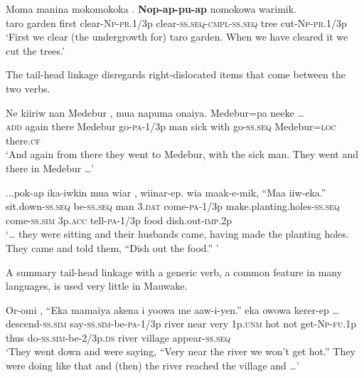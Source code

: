 \ea%
\label{ex:8:x1517}
\gll Moma  manina  mokomokoka  \textstyleEmphasizedVernacularWords{-}\textstyleEmphasizedVernacularWords{-}. \textbf{Nop}\textbf{-}\textbf{ap-pu}\textbf{-}\textbf{ap}  nomokowa  warimik. \\
taro  garden  first  clear-\textsc{Np}-\textsc{pr}.1/3p clear-\textsc{ss}.\textsc{seq}-\textsc{cmpl}-\textsc{ss}.\textsc{seq} tree cut-\textsc{Np}-\textsc{pr}.1/3p     \\
\glt`First we clear (the undergrowth for) taro garden. When we have cleared it we cut the trees.'
\z
{}


The tail-head linkage disregards right-dislocated items that come between the two verbs. 

\ea%
\label{ex:8:x1518}
\gll Ne  kiiriw  nan  Medebur  ,  mua  napuma  onaiya.   Medebur=pa  neeke  {\dots}\\
\textsc{add} again  there  Medebur go-\textsc{pa}-1/3p  man  sick  with go-\textsc{ss}.\textsc{seq} Medebur=\textsc{loc} there.\textsc{cf}\\
\glt`And again from there they went to Medebur, with the sick man. They went and there in Medebur {\dots}'
\z


\ea%
\label{ex:8:x1519}
\gll ...pok-ap  ika-iwkin  mua  wiar  , wiinar-ep.    wia  maak-e-mik, ``Maa  iiw-eka.'' \\
sit.down-\textsc{ss}.\textsc{seq} be-\textsc{ss}.\textsc{seq} man  3.\textsc{dat} come-\textsc{pa}-1/3p make.planting.holes-\textsc{ss}.\textsc{seq} come-\textsc{ss}.\textsc{sim} 3p.\textsc{acc} tell-\textsc{pa}-1/3p food dish.out-\textsc{imp}.2p\\
\glt`{\dots} they were sitting and their husbands came, having made the planting holes. They came and told them, ``Dish out the food.'' '
\z


A summary tail-head linkage with a generic verb, a common feature in many  languages, is used very little in Mauwake. 

\ea%
\label{ex:8:x1520}
\gll Or-omi  ,  ``Eka  mamaiya  akena i  yoowa  me  aaw-i-yen.''    eka owowa kerer-ep {\dots}\\
descend-\textsc{ss}.\textsc{sim} say-\textsc{ss}.\textsc{sim}-be-\textsc{pa}-1/3p river near very 1p.\textsc{unm} hot  not  get-\textsc{Np}-\textsc{fu}.1p thus do-\textsc{ss}.\textsc{sim}-be-2/3p.\textsc{ds} river  village  appear-\textsc{ss}.\textsc{seq}\\
\glt`They went down and were saying, ``Very near the river we won't get hot.'' They were doing like that and (then) the river reached the village and {\dots}'
\z


